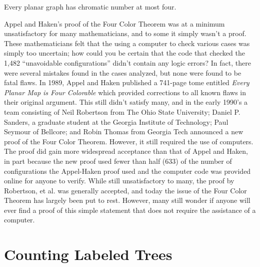 \begin{theorem}\label{thm:4ct}
  Every planar graph has chromatic number at most four.
\end{theorem}

Appel and Haken's proof of the Four Color Theorem was at a minimum
unsatisfactory for many mathematicians, and to some it simply wasn't a
proof. These mathematicians felt that the using a computer to check
various cases was simply too uncertain; how could you be certain that
the code that checked the 1,482 ``unavoidable configurations'' didn't
contain any logic errors? In fact, there were several mistakes found
in the cases analyzed, but none were found to be fatal flaws. In 1989,
Appel and Haken published a 741-page tome entitled \textit{Every
  Planar Map is Four Colorable} which provided corrections to all
known flaws in their original argument. This still didn't satisfy
many, and in the early 1990's a team consisting of Neil Robertson from
The Ohio State University; Daniel P. Sanders, a graduate student at
the Georgia Institute of Technology; Paul Seymour of
Bellcore; and Robin Thomas from Georgia Tech announced a new proof of
the Four Color Theorem. However, it still required the use of
computers. The proof did gain more widespread acceptance than that of
Appel and Haken, in part because the new proof used fewer than half
($633$) of the number of configurations the Appel-Haken proof used and
the computer code was provided online for anyone to verify. While
still unsatisfactory to many, the proof by Robertson, et al. was
generally accepted, and today the issue of the Four Color Theorem has
largely been put to rest. However, many still wonder if anyone will
ever find a proof of this simple statement that does not require the
assistance of a computer.

\section{Counting Labeled Trees}\label{s:graphs:counting-trees}

